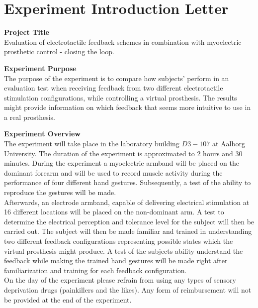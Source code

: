 \newpage
\section{Experiment Introduction Letter}

\textbf{Project Title} \\
Evaluation of electrotactile feedback schemes in combination with myoelectric prosthetic control - closing the loop. 

\textbf{Experiment Purpose} \\
The purpose of the experiment is to compare how subjects' perform in an evaluation test when receiving feedback from two different electrotactile stimulation configurations, while controlling a virtual prosthesis. The results might provide information on which feedback that seems more intuitive to use in a real prosthesis.   

\textbf{Experiment Overview} \\
The experiment will take place in the laboratory building $D3-107$ at Aalborg University. The duration of the experiment is approximated to 2 hours and 30 minutes. During the experiment a myoelectric armband will be placed on the dominant forearm and will be used to record muscle activity during the performance of four different  hand gestures. Subsequently, a test of the ability to reproduce the gestures will be made. \\
Afterwards, an electrode armband, capable of delivering electrical stimulation at 16 different locations will be placed on the non-dominant arm. A test to determine the electrical perception and tolerance level for the subject will then be carried out. The subject will then be made familiar and trained in understanding two different feedback configurations representing possible states which the virtual prosthesis might produce. A test of the subjects ability understand the feedback while making the trained hand gestures will be made right after familiarization and training for each feedback configuration. \\
On the day of the experiment please refrain from using any types of sensory deprivation drugs (painkillers and the likes). Any form of reimbursement will not be provided at the end of the experiment.   